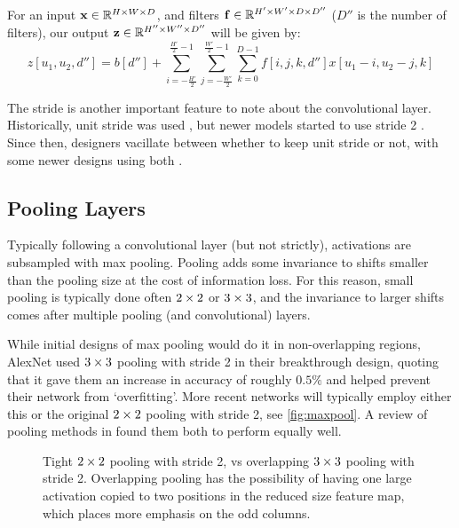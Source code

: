   For an input $\mathbf{x} \in \mathbb{R}^{H\times W\times D}$, and filters 
  $\mathbf{f} \in \mathbb{R}^{H'\times W'  \times D \times D''}$ ($D''$ is the 
  number of filters), our output $\mathbf{z} \in
  \mathbb{R}^{H''\times W'' \times D''}$ will be given by:
  \begin{equation}
    z[u_1, u_2, d''] = b[d''] + \sum_{i=-\frac{H'}{2}}^{\frac{H'}{2}-1}
                       \sum_{j=-\frac{W'}{2}}^{\frac{W'}{2}-1}  \sum_{k=0}^{D-1}  
                        f[i, j, k, d''] x[u_1-i, u_2-j, k]
  \end{equation}

  The stride is another important feature to note about the convolutional
  layer. Historically, unit stride was used \citep{lecun_gradient-based_1998,
  krizhevsky_imagenet_2012}, but newer models started to use stride 2 
   \citep{szegedy_going_2015}. Since then, designers vacillate between whether
   to keep unit stride or not, with some newer designs using both
   \citep{szegedy_inception-v4_2016}.

\subsection{Pooling Layers}\label{sec:cnn_pooling} 
  Typically following a convolutional layer (but not strictly), activations are subsampled with
  max pooling. Pooling adds some invariance to shifts smaller than the pooling
  size at the cost of information loss. For this reason, small pooling is
  typically done often $2\times 2$ or $3\times 3$, and the invariance to larger shifts
  comes after multiple pooling (and convolutional) layers.
  
  While initial designs of max pooling would do it in non-overlapping regions, 
  AlexNet used $3\times 3$ pooling with stride 2 in their breakthrough design,
  quoting that it gave them an increase in accuracy of roughly $0.5\%$ and
  helped prevent their network from `overfitting'. More recent networks will
  typically employ either this or the original $2\times 2$ pooling with stride 2,
  see \autoref{fig:maxpool}. A review of pooling methods in
  \citep{mishkin_systematic_2016} found them both to perform equally well.
  
  \begin{figure}
    \centering
    \centering
    \caption[Tight vs.\ overlapping pooling]
            { Tight $2\times 2$ pooling with stride 2, vs
             overlapping $3\times 3$ pooling with
            stride 2. Overlapping pooling has the possibility of having one
            large activation copied to two positions in the reduced size
            feature map, which places more emphasis on the odd columns.}
    \label{fig:maxpool}
  \end{figure}
  
